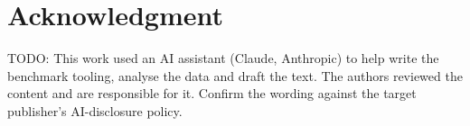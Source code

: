 \documentclass[journal]{IEEEtran}
\begin{document}
\section*{Acknowledgment}
TODO: This work used an AI assistant (Claude, Anthropic) to help write the benchmark tooling, analyse the data and draft the text. The authors reviewed the content and are responsible for it. Confirm the wording against the target publisher's AI-disclosure policy.



\end{document}
